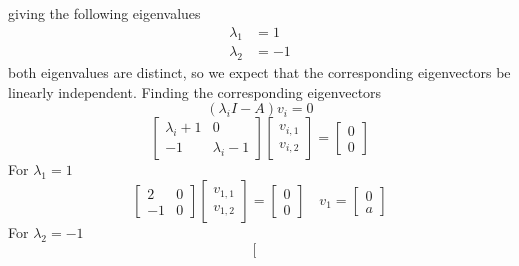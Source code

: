 \begin{example}
  giving the following eigenvalues
  \begin{equation*}
    \begin{split}
      \lambda_{1}&=1 \\
      \lambda_{2}&=-1
    \end{split}
  \end{equation*}
  both eigenvalues are distinct, so we expect that the corresponding eigenvectors be linearly independent.
  Finding the corresponding eigenvectors
  \begin{equation*}
    (\lambda_{i} I-A)v_{i}=0
  \end{equation*}
  \begin{equation*}
    \left[
      \begin{array}{cc}
        \lambda_{i}+1 & 0 \\
        -1 & \lambda_{i}-1
      \end{array}
    \right]
    \left[
      \begin{array}{c}
        v_{i,1} \\
        v_{i,2}
      \end{array}
    \right]
    =
    \left[
      \begin{array}{c}
        0 \\
        0
      \end{array}
    \right]
  \end{equation*}
  For $\lambda_{1}=1$
  \begin{equation*}
    \left[
      \begin{array}{cc}
        2 & 0 \\
        -1 & 0
      \end{array}
    \right]
    \left[
      \begin{array}{c}
        v_{1,1} \\
        v_{1,2}
      \end{array}
    \right]=
    \left[
      \begin{array}{c}
        0 \\
        0
      \end{array}
    \right]
    \quad v_{1}=
    \left[
      \begin{array}{c}
        0 \\
        a
      \end{array}
    \right]
  \end{equation*}
  For $\lambda_{2}=-1$
  \begin{equation*}
    \left[
      \begin{array}{cc}

\end{array}
\end{equation*}
\end{example}
